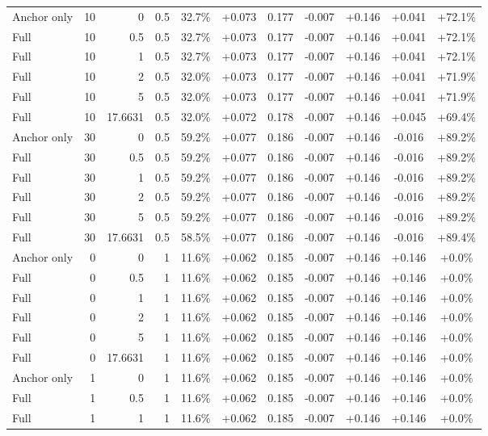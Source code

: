 \begin{table}[htbp]
\begin{tabular}{lrrrccccccc}
Anchor only & 10 & 0 & 0.5 & 32.7\% & +0.073 & 0.177 & -0.007 & +0.146 & +0.041 & +72.1\% \\
Full & 10 & 0.5 & 0.5 & 32.7\% & +0.073 & 0.177 & -0.007 & +0.146 & +0.041 & +72.1\% \\
Full & 10 & 1 & 0.5 & 32.7\% & +0.073 & 0.177 & -0.007 & +0.146 & +0.041 & +72.1\% \\
Full & 10 & 2 & 0.5 & 32.0\% & +0.073 & 0.177 & -0.007 & +0.146 & +0.041 & +71.9\% \\
Full & 10 & 5 & 0.5 & 32.0\% & +0.073 & 0.177 & -0.007 & +0.146 & +0.041 & +71.9\% \\
Full & 10 & 17.6631 & 0.5 & 32.0\% & +0.072 & 0.178 & -0.007 & +0.146 & +0.045 & +69.4\% \\
Anchor only & 30 & 0 & 0.5 & 59.2\% & +0.077 & 0.186 & -0.007 & +0.146 & -0.016 & +89.2\% \\
Full & 30 & 0.5 & 0.5 & 59.2\% & +0.077 & 0.186 & -0.007 & +0.146 & -0.016 & +89.2\% \\
Full & 30 & 1 & 0.5 & 59.2\% & +0.077 & 0.186 & -0.007 & +0.146 & -0.016 & +89.2\% \\
Full & 30 & 2 & 0.5 & 59.2\% & +0.077 & 0.186 & -0.007 & +0.146 & -0.016 & +89.2\% \\
Full & 30 & 5 & 0.5 & 59.2\% & +0.077 & 0.186 & -0.007 & +0.146 & -0.016 & +89.2\% \\
Full & 30 & 17.6631 & 0.5 & 58.5\% & +0.077 & 0.186 & -0.007 & +0.146 & -0.016 & +89.4\% \\
Anchor only & 0 & 0 & 1 & 11.6\% & +0.062 & 0.185 & -0.007 & +0.146 & +0.146 & +0.0\% \\
Full & 0 & 0.5 & 1 & 11.6\% & +0.062 & 0.185 & -0.007 & +0.146 & +0.146 & +0.0\% \\
Full & 0 & 1 & 1 & 11.6\% & +0.062 & 0.185 & -0.007 & +0.146 & +0.146 & +0.0\% \\
Full & 0 & 2 & 1 & 11.6\% & +0.062 & 0.185 & -0.007 & +0.146 & +0.146 & +0.0\% \\
Full & 0 & 5 & 1 & 11.6\% & +0.062 & 0.185 & -0.007 & +0.146 & +0.146 & +0.0\% \\
Full & 0 & 17.6631 & 1 & 11.6\% & +0.062 & 0.185 & -0.007 & +0.146 & +0.146 & +0.0\% \\
Anchor only & 1 & 0 & 1 & 11.6\% & +0.062 & 0.185 & -0.007 & +0.146 & +0.146 & +0.0\% \\
Full & 1 & 0.5 & 1 & 11.6\% & +0.062 & 0.185 & -0.007 & +0.146 & +0.146 & +0.0\% \\
Full & 1 & 1 & 1 & 11.6\% & +0.062 & 0.185 & -0.007 & +0.146 & +0.146 & +0.0\% \\

\end{tabular}
\end{table}
